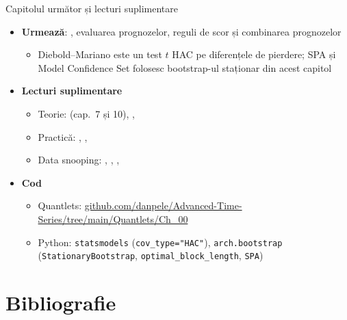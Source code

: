 \begin{frame}{Capitolul următor și lecturi suplimentare}
\itemsize{\small}
\begin{itemize}
    \item \textbf{Urmează}: , evaluarea prognozelor, reguli de scor și combinarea prognozelor
    \begin{itemize}
        \item Diebold--Mariano este un test $t$ HAC pe diferențele de pierdere; SPA și Model Confidence Set folosesc bootstrap-ul staționar din acest capitol
    \end{itemize}
    \item \textbf{Lecturi suplimentare}
    \begin{itemize}
        \item Teorie:  (cap.\ 7 și 10), , 
        \item Practică: , , 
        \item Data snooping: , , , 
    \end{itemize}
    \item \textbf{Cod}
    \begin{itemize}
        \item Quantlets: \href{https://github.com/danpele/Advanced-Time-Series/tree/main/Quantlets/Ch_00}{github.com/danpele/Advanced-Time-Series/tree/main/Quantlets/Ch\_00}
        \item Python: \texttt{statsmodels} (\texttt{cov\_type="HAC"}), \texttt{arch.bootstrap} (\texttt{StationaryBootstrap}, \texttt{optimal\_block\_length}, \texttt{SPA})
    \end{itemize}
\end{itemize}
\end{frame}


\section{Bibliografie}


